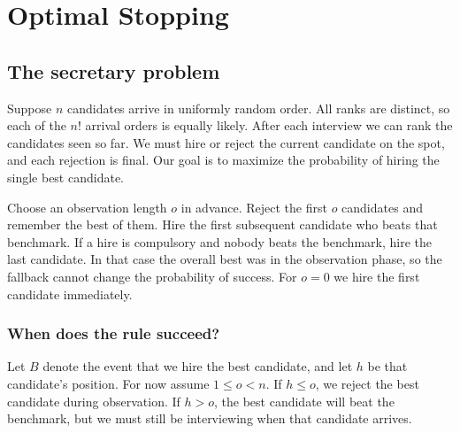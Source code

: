 \documentclass[a4paper,10pt]{article}
\date{11/22/26}
\begin{document}
\section{Optimal Stopping}

\subsection{The secretary problem}
Suppose $n$ candidates arrive in uniformly random order. All ranks are distinct,
so each of the $n!$ arrival orders is equally likely. After each interview we
can rank the candidates seen so far. We must hire or reject the current
candidate on the spot, and each rejection is final. Our goal is to maximize
the probability of hiring the single best candidate.

Choose an observation length $o$ in advance. Reject the first $o$ candidates
and remember the best of them. Hire the first subsequent candidate who beats
that benchmark. If a hire is compulsory and nobody beats the benchmark,
hire the last candidate. In that case the overall best was in the observation
phase, so the fallback cannot change the probability of success.
For $o=0$ we hire the first candidate immediately.

\begin{center}
\end{center}

\subsubsection*{When does the rule succeed?}
Let $B$ denote the event that we hire the best candidate, and let $h$ be that
candidate's position. For now assume $1\le o<n$. If $h\le o$, we reject the
best candidate during observation. If $h>o$, the best candidate will beat
the benchmark, but we must still be interviewing when that candidate arrives.
\end{document}
